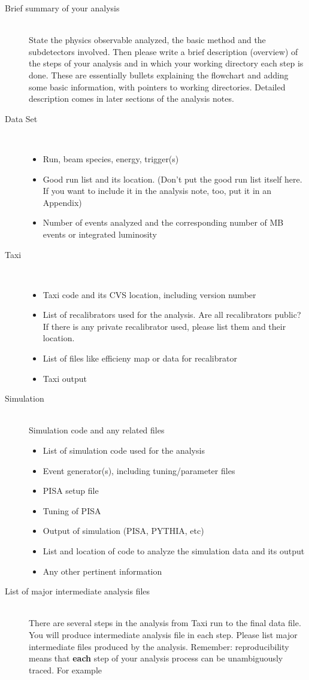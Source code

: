 \documentclass[12pt]{article}
\begin{document}
\begin{description}
\item [Brief summary of your analysis]~\\
State the physics observable analyzed, the basic method and the
subdetectors involved.  Then please write a brief description
(overview) of the steps of your analysis and in 
which your working directory each step is done.
These are essentially bullets explaining the flowchart and adding some
basic information, with pointers to working directories.
Detailed description comes in later sections of the analysis notes.
\item [Data Set] ~\\
\begin{itemize}
\item Run, beam species, energy, trigger(s)
\item Good run list and its location.   (Don't put the good run list 
itself here. If you want to include it in the analysis note, too, put
it in an Appendix)
\item Number of events analyzed and the corresponding number of MB 
events or integrated luminosity
\end{itemize}
\item [Taxi] ~\\
\begin{itemize}
\item Taxi code and its CVS location, including version number
\item List of recalibrators used for the analysis. Are all
recalibrators public? If there is any private recalibrator used, 
please list them and their location.
\item List of files like efficieny map or data for recalibrator
\item Taxi output
\end{itemize}
\item [Simulation] ~\\
Simulation code and any related files
\begin{itemize}
\item List of simulation code used for the analysis
\item Event generator(s), including tuning/parameter files
\item PISA setup file
\item Tuning of PISA
\item Output of simulation (PISA, PYTHIA, etc)
\item List and location of code to analyze the simulation data and its output
\item Any other pertinent information
\end{itemize}
\item [List of major intermediate analysis files] ~\\
There are several steps in the analysis from Taxi run to the final
data file. You will produce intermediate analysis file in each
step. Please list major intermediate files produced by the
analysis. Remember: reproducibility means that {\bf each} step of your
analysis process can be unambiguously traced.  For example


\end{description}
\end{document}
